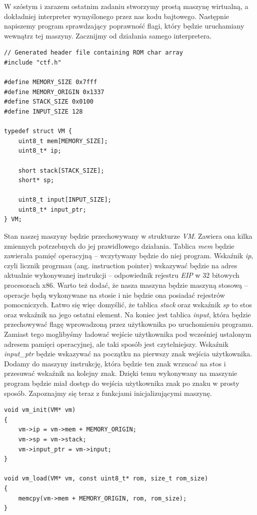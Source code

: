 \documentclass[language=polish,type=eng]{aghmodern}
\begin{document}
W szóstym i zarazem ostatnim zadaniu stworzymy prostą maszynę wirtualną, a dokładniej
interpreter wymyślonego przez nas kodu bajtowego. Następnie napiszemy program sprawdzający
poprawność flagi, który będzie uruchamiany wewnątrz tej maszyny. Zacznijmy od działania
samego interpretera.

\begin{verbatim}
// Generated header file containing ROM char array
#include "ctf.h"

#define MEMORY_SIZE 0x7fff
#define MEMORY_ORIGIN 0x1337
#define STACK_SIZE 0x0100
#define INPUT_SIZE 128

typedef struct VM {
    uint8_t mem[MEMORY_SIZE];
    uint8_t* ip;

    short stack[STACK_SIZE];
    short* sp;

    uint8_t input[INPUT_SIZE];
    uint8_t* input_ptr;
} VM;
\end{verbatim}

Stan naszej maszyny będzie przechowywany w strukturze \emph{VM}. Zawiera ona kilka zmiennych
potrzebnych do jej prawidłowego działania. Tablica \emph{mem} będzie zawierała pamięć operacyjną --
wczytywany będzie do niej program. Wskaźnik \emph{ip}, czyli licznik progrmau (ang. instruction pointer)
wskazywać będzie na adres aktualnie wykonywanej instrukcji -- odpowiednik rejestru \emph{EIP}
w 32 bitowych procesorach x86. Warto też dodać, że nasza maszyna będzie maszyną stosową
-- operacje będą wykonywane na stosie i nie będzie ona posiadać rejestrów pomocniczych.
Łatwo się więc domyślić, że tablica \emph{stack} oraz wskaźnik \emph{sp}
to stos oraz wskaźnik na jego ostatni element. Na koniec jest tablica \emph{input},
która będzie przechowywać flagę wprowadzoną przez użytkownika po uruchomieniu programu.
Zamiast tego moglibyśmy ładować wejście użytkownika pod wcześniej ustalonym adresem pamięci
operacyjnej, ale taki sposób jest czytelniejszy. Wskaźnik \emph{input\_ptr} będzie wskazywać
na początku na pierwszy znak wejścia użytkownika. Dodamy do maszyny instrukcję, która będzie ten
znak wrzucać na stos i przesuwać wskaźnik na kolejny znak. Dzięki temu wykonywany na maszynie
program będzie miał dostęp do wejścia użytkownika znak po znaku w prosty sposób.
Zapoznajmy się teraz z funkcjami inicjalizującymi maszynę.

\begin{verbatim}
void vm_init(VM* vm)
{
    vm->ip = vm->mem + MEMORY_ORIGIN;
    vm->sp = vm->stack;
    vm->input_ptr = vm->input;
}

void vm_load(VM* vm, const uint8_t* rom, size_t rom_size)
{
    memcpy(vm->mem + MEMORY_ORIGIN, rom, rom_size);
}
\end{verbatim}
\end{document}
